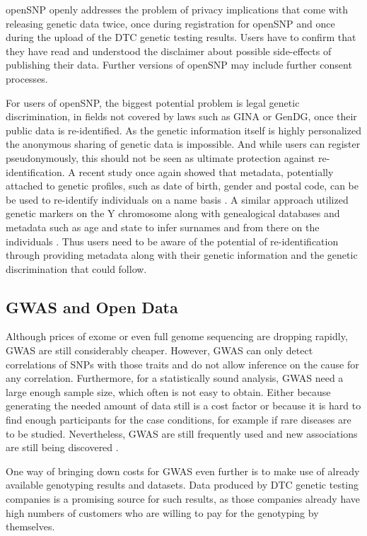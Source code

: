 \documentclass[10pt]{article}
\begin{document}
openSNP openly addresses the problem of privacy implications that come with releasing genetic data twice, once during registration for openSNP and once during 
the upload of the DTC genetic testing results. Users have to confirm that they have read and understood the disclaimer about possible side-effects 
of publishing their data. Further versions of openSNP may include further consent processes.

For users of openSNP, the biggest potential problem is legal genetic discrimination, in fields not covered by laws such as GINA or GenDG, once their public data is re-identified. As the genetic information itself is highly personalized the anonymous sharing of genetic data is impossible. And while users can register pseudonymously, this should not be seen as ultimate protection against re-identification. 
A recent study once again showed that metadata, potentially attached to genetic profiles, such as date of birth, gender and postal code, can be be used to re-identify individuals on a name basis \cite{Sweeney2013}. 
A similar approach utilized genetic markers on the Y chromosome along with genealogical databases and metadata such as age and state to infer surnames and from there on the individuals \cite{Gymrek18012013}. 
Thus users need to be aware of the potential of re-identification through providing metadata along with their genetic information and the genetic discrimination that could follow.

\subsection*{GWAS and Open Data}
Although prices of exome or even full genome sequencing are dropping rapidly, GWAS are still considerably cheaper. However, GWAS can only detect correlations of SNPs with those traits and do not allow 
inference on the cause for any correlation. Furthermore, for a statistically sound analysis, GWAS need a large enough sample size, which often is not easy to obtain. Either because generating the needed amount of data still is a cost factor or because it is hard to find enough participants for the case conditions, for example if rare diseases are to be studied. Nevertheless, GWAS are still frequently used and new associations are still being discovered \cite{10.1371.journal.pone.0031470,10.1371.journal.pone.0030309,10.1371.journal.pone.0029848}. 

One way of bringing down costs for GWAS even further is to make use of already available genotyping results and datasets. 
Data produced by DTC genetic testing companies is a promising source for such results, as those companies already have high 
numbers of customers who are willing to pay for the genotyping by themselves. 
\end{document}
